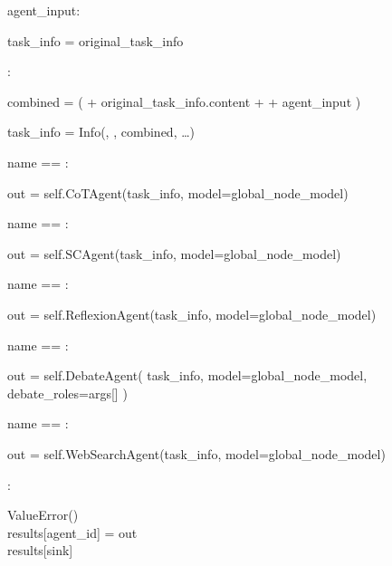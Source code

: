 \begin{subagent}[title=高 DoM 解析器]
\quad\quad {}  agent\_input:

\quad\quad\quad task\_info = original\_task\_info

\quad\quad {}:

\quad\quad\quad combined = (
 + original\_task\_info.content +  + agent\_input
)

\quad\quad\quad task\_info = Info(, , combined, \dots) \\

\quad\quad {}

\quad\quad {} name == :

\quad\quad\quad out =  self.CoTAgent(task\_info, model=global\_node\_model)

\quad\quad {} name == :

\quad\quad\quad out =  self.SCAgent(task\_info, model=global\_node\_model)

\quad\quad {} name == :

\quad\quad\quad out =  self.ReflexionAgent(task\_info, model=global\_node\_model)

\quad\quad {} name == :

\quad\quad\quad out =  self.DebateAgent(
task\_info,
model=global\_node\_model,
debate\_roles=args[]
)

\quad\quad {} name == :

\quad\quad\quad out =  self.WebSearchAgent(task\_info, model=global\_node\_model)

\quad\quad {}:

\quad\quad\quad {} ValueError() \\

\quad\quad results[agent\_id] = out \\

\quad {} results[sink] \\



\end{subagent}

